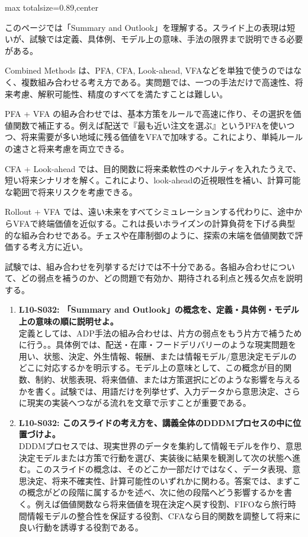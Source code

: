 \begin{minipage}[t]{0.58\textwidth}
\begin{adjustbox}{max totalsize={\textwidth}{0.89\textheight},center}
\begin{minipage}{\textwidth}\scriptsize
{}このページでは「Summary and Outlook」を理解する。スライド上の表現は短いが、試験では定義、具体例、モデル上の意味、手法の限界まで説明できる必要がある。\par
Combined Methods は、PFA, CFA, Look-ahead, VFAなどを単独で使うのではなく、複数組み合わせる考え方である。実問題では、一つの手法だけで高速性、将来考慮、解釈可能性、精度のすべてを満たすことは難しい。\par
PFA + VFA の組み合わせでは、基本方策をルールで高速に作り、その選択を価値関数で補正する。例えば配送で『最も近い注文を選ぶ』というPFAを使いつつ、将来需要が多い地域に残る価値をVFAで加味する。これにより、単純ルールの速さと将来考慮を両立できる。\par
CFA + Look-ahead では、目的関数に将来柔軟性のペナルティを入れたうえで、短い将来シナリオを解く。これにより、look-aheadの近視眼性を補い、計算可能な範囲で将来リスクを考慮できる。\par
Rollout + VFA では、遠い未来をすべてシミュレーションする代わりに、途中からVFAで終端価値を近似する。これは長いホライズンの計算負荷を下げる典型的な組み合わせである。チェスや在庫制御のように、探索の末端を価値関数で評価する考え方に近い。\par
試験では、組み合わせを列挙するだけでは不十分である。各組み合わせについて、どの弱点を補うのか、どの問題で有効か、期待される利点と残る欠点を説明する。\par{}\begin{enumerate}\item \textbf{L10-S032: 「Summary and Outlook」の概念を、定義・具体例・モデル上の意味の順に説明せよ。}\\定義としては、ADP手法の組み合わせは、片方の弱点をもう片方で補うために行う。。具体例では、配送・在庫・フードデリバリーのような現実問題を用い、状態、決定、外生情報、報酬、または情報モデル/意思決定モデルのどこに対応するかを明示する。モデル上の意味として、この概念が目的関数、制約、状態表現、将来価値、または方策選択にどのような影響を与えるかを書く。試験では、用語だけを列挙せず、入力データから意思決定、さらに現実の実装へつながる流れを文章で示すことが重要である。\item \textbf{L10-S032: このスライドの考え方を、講義全体のDDDMプロセスの中に位置づけよ。}\\DDDMプロセスでは、現実世界のデータを集約して情報モデルを作り、意思決定モデルまたは方策で行動を選び、実装後に結果を観測して次の状態へ進む。このスライドの概念は、そのどこか一部だけではなく、データ表現、意思決定、将来不確実性、計算可能性のいずれかに関わる。答案では、まずこの概念がどの段階に属するかを述べ、次に他の段階へどう影響するかを書く。例えば価値関数なら将来価値を現在決定へ戻す役割、FIFOなら旅行時間情報モデルの整合性を保証する役割、CFAなら目的関数を調整して将来に良い行動を誘導する役割である。\end{enumerate}
\end{minipage}
\end{adjustbox}
\end{minipage}



